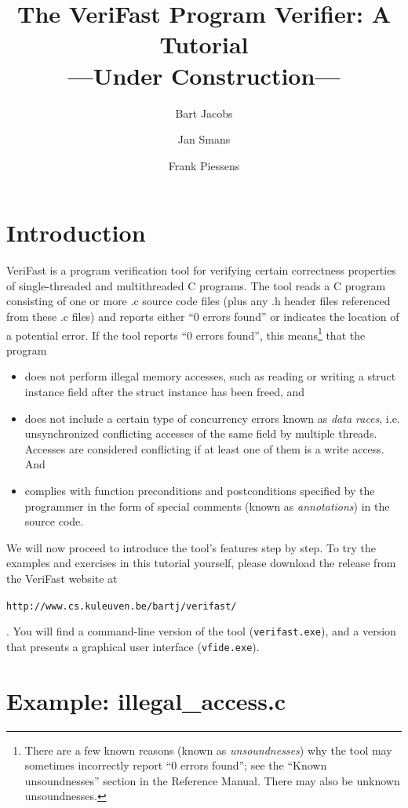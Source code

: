 \documentclass{article}
\title{The VeriFast Program Verifier: A Tutorial\\
---Under Construction---}
\author{Bart Jacobs \and Jan Smans \and Frank Piessens}
\begin{document}
\maketitle

\section{Introduction}

VeriFast is a program verification tool for verifying certain
correctness properties of single-threaded and multithreaded C
programs. The tool reads a C program consisting of one or more
.c source code files (plus any .h header files referenced from
these .c files) and reports either ``0 errors found'' or
indicates the location of a potential error. If the tool
reports ``0 errors found'', this means\footnote{There are a few
known reasons (known as \emph{unsoundnesses}) why the tool may
sometimes incorrectly report ``0 errors found''; see the
``Known unsoundnesses'' section in the Reference Manual. There
may also be unknown unsoundnesses.} that the program
\begin{itemize}
\item does not perform illegal memory accesses, such as
    reading or writing a struct instance field after the
    struct instance has been freed, and
\item does not include a certain type of concurrency errors
    known as \emph{data races}, i.e. unsynchronized
    conflicting accesses of the same field by multiple
    threads. Accesses are considered conflicting if at
    least one of them is a write access. And
\item complies with function preconditions and
    postconditions specified by the programmer in the form
    of special comments (known as \emph{annotations}) in
    the source code.
\end{itemize}

We will now proceed to introduce the tool's features step by
step. To try the examples and exercises in this tutorial
yourself, please download the release from the VeriFast website
at
\begin{center}
\texttt{http://www.cs.kuleuven.be/bartj/verifast/}
\end{center}
. You will find a command-line version of the tool
(\texttt{verifast.exe}), and a version that presents a
graphical user interface (\texttt{vfide.exe}).

\section{Example: illegal\_access.c}
\end{document}
